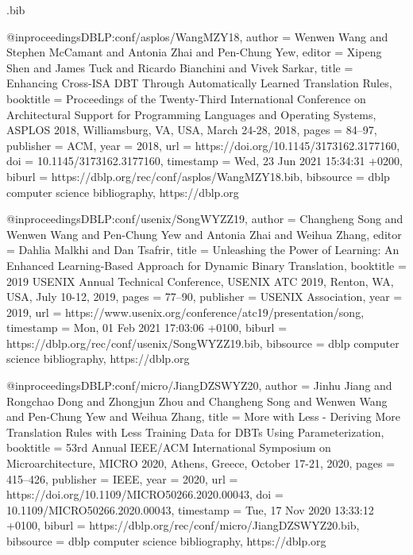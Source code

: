 \usepackage{filecontents}

\begin{filecontents}{\jobname.bib}

@inproceedings{DBLP:conf/asplos/WangMZY18,
	author    = {Wenwen Wang and
		Stephen McCamant and
		Antonia Zhai and
		Pen{-}Chung Yew},
	editor    = {Xipeng Shen and
		James Tuck and
		Ricardo Bianchini and
		Vivek Sarkar},
	title     = {Enhancing Cross-ISA {DBT} Through Automatically Learned Translation
		Rules},
	booktitle = {Proceedings of the Twenty-Third International Conference on Architectural
		Support for Programming Languages and Operating Systems, {ASPLOS}
		2018, Williamsburg, VA, USA, March 24-28, 2018},
	pages     = {84--97},
	publisher = {{ACM}},
	year      = {2018},
	url       = {https://doi.org/10.1145/3173162.3177160},
	doi       = {10.1145/3173162.3177160},
	timestamp = {Wed, 23 Jun 2021 15:34:31 +0200},
	biburl    = {https://dblp.org/rec/conf/asplos/WangMZY18.bib},
	bibsource = {dblp computer science bibliography, https://dblp.org}
}

@inproceedings{DBLP:conf/usenix/SongWYZZ19,
	author    = {Changheng Song and
		Wenwen Wang and
		Pen{-}Chung Yew and
		Antonia Zhai and
		Weihua Zhang},
	editor    = {Dahlia Malkhi and
		Dan Tsafrir},
	title     = {Unleashing the Power of Learning: An Enhanced Learning-Based Approach
		for Dynamic Binary Translation},
	booktitle = {2019 {USENIX} Annual Technical Conference, {USENIX} {ATC} 2019, Renton,
		WA, USA, July 10-12, 2019},
	pages     = {77--90},
	publisher = {{USENIX} Association},
	year      = {2019},
	url       = {https://www.usenix.org/conference/atc19/presentation/song},
	timestamp = {Mon, 01 Feb 2021 17:03:06 +0100},
	biburl    = {https://dblp.org/rec/conf/usenix/SongWYZZ19.bib},
	bibsource = {dblp computer science bibliography, https://dblp.org}
}

@inproceedings{DBLP:conf/micro/JiangDZSWYZ20,
	author    = {Jinhu Jiang and
		Rongchao Dong and
		Zhongjun Zhou and
		Changheng Song and
		Wenwen Wang and
		Pen{-}Chung Yew and
		Weihua Zhang},
	title     = {More with Less - Deriving More Translation Rules with Less Training
		Data for DBTs Using Parameterization},
	booktitle = {53rd Annual {IEEE/ACM} International Symposium on Microarchitecture,
		{MICRO} 2020, Athens, Greece, October 17-21, 2020},
	pages     = {415--426},
	publisher = {{IEEE}},
	year      = {2020},
	url       = {https://doi.org/10.1109/MICRO50266.2020.00043},
	doi       = {10.1109/MICRO50266.2020.00043},
	timestamp = {Tue, 17 Nov 2020 13:33:12 +0100},
	biburl    = {https://dblp.org/rec/conf/micro/JiangDZSWYZ20.bib},
	bibsource = {dblp computer science bibliography, https://dblp.org}
}

\end{filecontents}